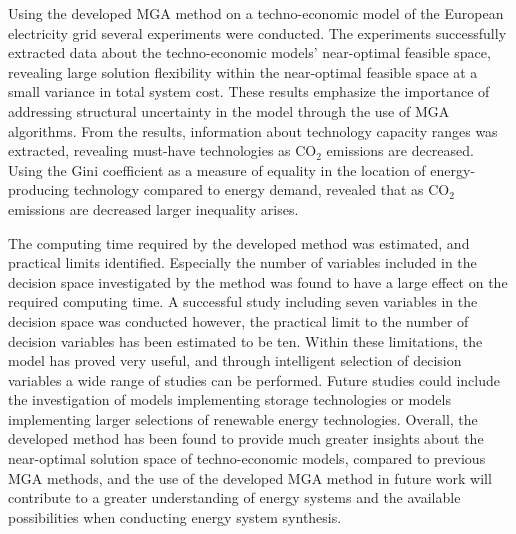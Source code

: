 Using the developed MGA method on a techno-economic model of the European electricity grid several experiments were conducted. The experiments successfully extracted data about the techno-economic models' near-optimal feasible space, revealing large solution flexibility within the near-optimal feasible space at a small variance in total system cost. These results emphasize the importance of addressing structural uncertainty in the model through the use of MGA algorithms. From the results, information about technology capacity ranges was extracted, revealing must-have technologies as $\text{CO}_2$ emissions are decreased. Using the Gini coefficient as a measure of equality in the location of energy-producing technology compared to energy demand, revealed that as $\text{CO}_2$ emissions are decreased larger inequality arises. 

The computing time required by the developed method was estimated, and practical limits identified. Especially the number of variables included in the decision space investigated by the method was found to have a large effect on the required computing time. A successful study including seven variables in the decision space was conducted however, the practical limit to the number of decision variables has been estimated to be ten. Within these limitations, the model has proved very useful, and through intelligent selection of decision variables a wide range of studies can be performed. 
Future studies could include the investigation of models implementing storage technologies or models implementing larger selections of renewable energy technologies. 
Overall, the developed method has been found to provide much greater insights about the near-optimal solution space of techno-economic models, compared to previous MGA methods, and the use of the developed MGA method in future work will contribute to a greater understanding of energy systems and the available possibilities when conducting energy system synthesis.




